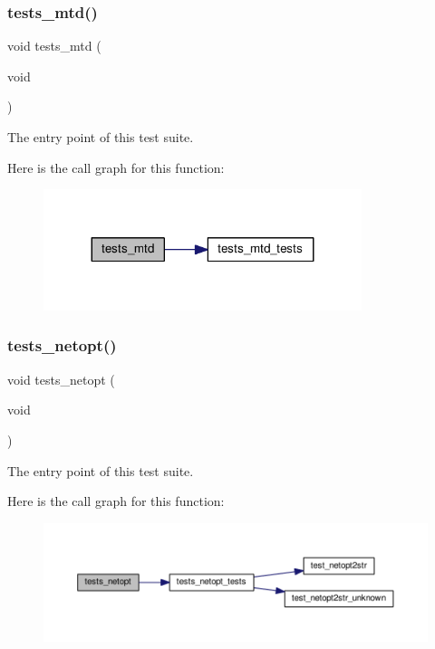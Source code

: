 \subsubsection{\texorpdfstring{tests\+\_\+mtd()}{tests\_mtd()}}
{\footnotesize\ttfamily void tests\+\_\+mtd (\begin{DoxyParamCaption}\item[{void}]{ }\end{DoxyParamCaption})}



The entry point of this test suite. 

Here is the call graph for this function\+:
\nopagebreak
\begin{figure}[H]
\begin{center}
\leavevmode
\includegraphics[width=263pt]{group__unittests_gad7854ffe9d06ab8bcefaf3b778460f2a_cgraph}
\end{center}
\end{figure}
\mbox{\label{group__unittests_gaf3cee24f6368b87755b19538a4f1564c}} 
\subsubsection{\texorpdfstring{tests\+\_\+netopt()}{tests\_netopt()}}
{\footnotesize\ttfamily void tests\+\_\+netopt (\begin{DoxyParamCaption}\item[{void}]{ }\end{DoxyParamCaption})}



The entry point of this test suite. 

Here is the call graph for this function\+:
\nopagebreak
\begin{figure}[H]
\begin{center}
\leavevmode
\includegraphics[width=350pt]{group__unittests_gaf3cee24f6368b87755b19538a4f1564c_cgraph}
\end{center}
\end{figure}
\mbox{\label{group__unittests_ga9597c8b9433b48f9ce8be48a398bd607}} 
